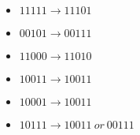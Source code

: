 \begin{enumerate}[label={\Alph*.},font={\bfseries}]
\begin{enumerate}[label={\arabic*},font={\bfseries}]
    \begin{itemize}
    \item $11111 \to 11101$
    \item $00101 \to 00111$
    \item $11000 \to 11010$
    \item $10011 \to 10011$
    \item $10001 \to 10011$
    \item $10111 \to 10011\ or\ 00111$
    \end{itemize}
  \end{enumerate}
\end{enumerate}
